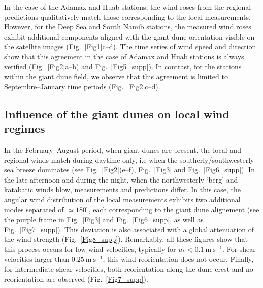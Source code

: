   In the case of the Adamax and Huab stations, the wind roses from the regional predictions qualitatively match those corresponding to the local measurements. However, for the Deep Sea and South Namib stations, the measured wind roses exhibit additional components aligned with the giant dune orientation visible on the satellite images (Fig.~\ref{Fig1}c--d).
  The time series of wind speed and direction show that this agreement in the case of Adamax and Huab stations is always verified (Fig.~\ref{Fig2}a--b) and Fig.~\ref{Fig5_supp}). In contrast, for the stations within the giant dune field, we observe that this agreement is limited to Septembre--January time periods (Fig.~\ref{Fig2}c--d).

  \subsection{Influence of the giant dunes on local wind regimes}
  \label{section_data_feedback}

  In the February--August period, when giant dunes are present, the local and regional winds match during daytime only, i.e when the southerly/southwesterly sea breeze dominates (see Fig.~\ref{Fig2}(e--f), Fig.~\ref{Fig3} and Fig.~\ref{Fig6_supp}). In the late afternoon and during the night, when the northwesterly `berg' and katabatic winds blow, measurements and predictions differ. In this case, the angular wind distribution of the local measurements exhibits two additional modes separated of $\simeq 180^\circ$, each corresponding to the giant dune alignement (see the purple frame in Fig.~\ref{Fig3} and Fig.~\ref{Fig6_supp}, as well as Fig.~\ref{Fig7_supp}). This deviation is also associated with a global attenuation of the wind strength (Fig.~\ref{Fig8_supp}). Remarkably, all these figures show that this process occurs for low wind velocities, typically for $u_{*} < 0.1~\textrm{m}~\textrm{s}^{-1}$. For shear velocities larger than $0.25~\textrm{m}~\textrm{s}^{-1}$, this wind reorientation does not occur. Finally, for intermediate shear velocities, both reorientation along the dune crest and no reorientation are observed (Fig.~\ref{Fig7_supp}).


